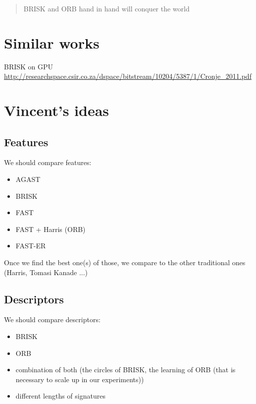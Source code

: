 \documentclass[a4paper,10pt]{article}
\title{}
\author{}
\begin{document}
\maketitle

\begin{abstract}
BRISK and ORB hand in hand will conquer the world
\end{abstract}


\section{Similar works}

BRISK on GPU
\url{http://researchspace.csir.co.za/dspace/bitstream/10204/5387/1/Cronje_2011.pdf}

\section{Vincent's ideas}

\subsection{Features}

We should compare features:
\begin{itemize}
 \item AGAST
 \item BRISK
 \item FAST
 \item FAST + Harris (ORB)
 \item FAST-ER 
\end{itemize}

Once we find the best one(s) of those, we compare to the other traditional ones
(Harris, Tomasi Kanade ...)

\subsection{Descriptors}

We should compare descriptors:
\begin{itemize}
 \item BRISK
 \item ORB
 \item combination of both (the circles of BRISK, the learning of ORB (that is
necessary to scale up in our experiments))
 \item different lengths of signatures
\end{itemize}
\end{document}
